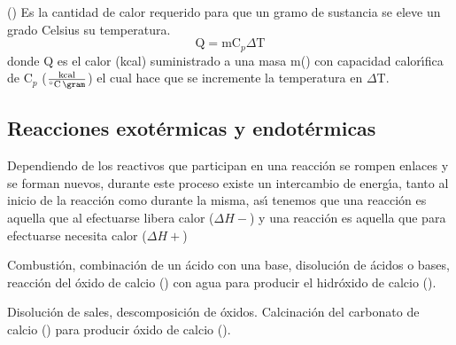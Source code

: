 \noindent\textbf{} () Es la cantidad de calor requerido para que un gramo de sustancia se eleve  un grado Celsius su temperatura.
\begin{equation}
\textrm{Q} =\textrm{m} \textrm{C}_p \Delta \textrm{T}
\end{equation}
 donde
Q es el calor  (kcal) suministrado a una masa m(\gram) con capacidad calor\'{\i}fica de C$_p$ ($\frac{\textrm{kcal}}{^\circ \textrm{C}\,\gram}$) el cual hace que se incremente la temperatura en $\Delta$T.

\subsection{Reacciones exot\'ermicas y endot\'ermicas}

Dependiendo de los reactivos que participan en una reacci\'on se rompen enlaces y se forman nuevos, durante este proceso existe un intercambio de energ\'{\i}a, tanto al inicio de la reacci\'on como durante la misma, as\'{\i} tenemos que una reacci\'on  es aquella que al efectuarse libera calor ($\Delta H -$)
 y una reacci\'on  es aquella que para efectuarse necesita calor ($\Delta H +$) 

\begin{example} 
Combusti\'on, combinaci\'on de un \'acido con una base, disoluci\'on de \'acidos o bases, reacci\'on del \'oxido de calcio () con agua para producir el hidr\'oxido de calcio ().
\end{example}
\begin{example}
 Disoluci\'on de sales, descomposici\'on de \'oxidos. Calcinaci\'on del carbonato de calcio () para producir \'oxido de calcio ().
\end{example}

